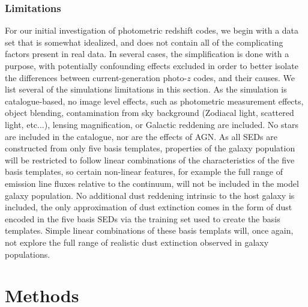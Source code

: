 \documentclass[usenatbib]{mn2e}
\newcommand{\red}[1]{\textcolor{red}{#1}}
\begin{document}
\subsubsection{Limitations}
\label{sec:buzzlimitations}
For our initial investigation of photometric redshift codes, we begin with a data set that is somewhat idealized, and does not contain all of the complicating factors present in real data.  In several cases, the simplification is done with a purpose, with potentially confounding effects excluded in order to better isolate the differences between current-generation photo-$z$ codes, and their causes.  We list several of the simulations limitations in this section.  
As the simulation is catalogue-based, no image level effects, such as photometric measurement effects, object blending, contamination from sky background (Zodiacal light, scattered light, etc...), lensing magnification, or Galactic reddening are included.  No stars are included in the catalogue, nor are the effects of AGN.
As all SEDs are constructed from only five basis templates, properties of the galaxy population will be restricted to follow linear combinations of the characteristics of the five basis templates, so certain non-linear features, for example the full range of emission line fluxes relative to the continuum, will not be included in the model galaxy population.  No additional dust reddening intrinsic to the host galaxy is included, the only approximation of dust extinction comes in the form of dust encoded in the five basis SEDs via the training set used to create the basis templates.  Simple linear combinations of these basis templats will, once again, not explore the full range of realistic dust extinction observed in galaxy populations.


\section{Methods}
\label{sec:pzcodes}
\end{document}
